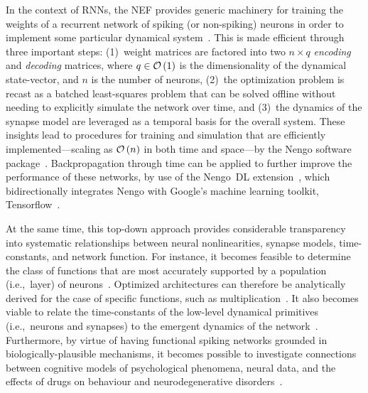 In the context of RNNs, the NEF provides generic machinery for training the weights of a recurrent network of spiking (or non-spiking) neurons in order to implement some particular dynamical system~\citep{dynamicspatent}.
This is made efficient through three important steps: (1)~weight matrices are factored into two $n \times q$ \emph{encoding} and \emph{decoding} matrices, where $q \in \mathcal{O}\left({1}\right)$ is the dimensionality of the dynamical state-vector, and $n$ is the number of neurons, (2)~the optimization problem is recast as a batched least-squares problem that can be solved offline without needing to explicitly simulate the network over time, and (3)~the dynamics of the synapse model are leveraged as a temporal basis for the overall system.
These insights lead to procedures for training and simulation that are efficiently implemented---scaling as $\mathcal{O}\left({n}\right)$ in both time and space---by the Nengo software package~\citep{bekolay2014}.
Backpropagation through time can be applied to further improve the performance of these networks, by use of the Nengo~DL extension~\citep{hunsberger2018, rasmussen2018nengodl, blouw2018a}, which bidirectionally integrates Nengo with Google's machine learning toolkit, Tensorflow~\citep{abadi2016tensorflow}.

At the same time, this top-down approach provides considerable transparency into systematic relationships between neural nonlinearities, synapse models, time-constants, and network function.
For instance, it becomes feasible to determine the class of functions that are most accurately supported by a population (i.e.,~layer) of neurons~\citep[][pp.~185--217]{eliasmith2003a}.
Optimized architectures can therefore be analytically derived for the case of specific functions, such as multiplication~\citep{jgosmann2015}.
It also becomes viable to relate the time-constants of the low-level dynamical primitives (i.e.,~neurons and synapses) to the emergent dynamics of the network~\citep{voelker2018}.
Furthermore, by virtue of having functional spiking networks grounded in biologically-plausible mechanisms, it becomes possible to investigate connections between cognitive models of psychological phenomena, neural data, and the effects of drugs on behaviour and neurodegenerative disorders~\citep{eliasmith2013build, eliasmith2016biospaun, duggins2017b}.

